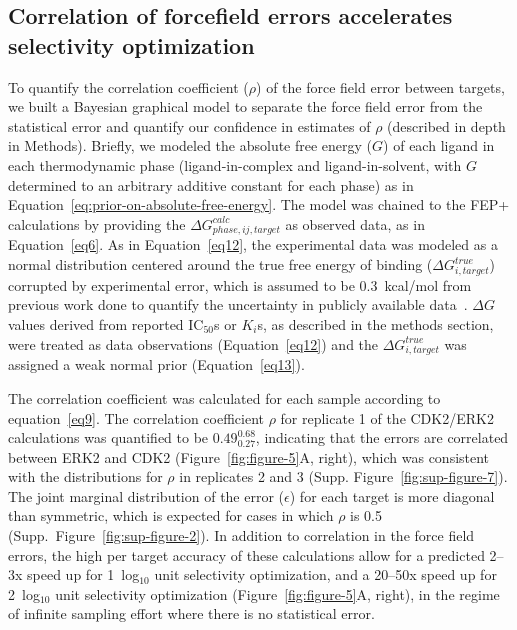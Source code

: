 \documentclass[phd,tocprelim]{cornell}
\begin{document}
\subsection{Correlation of forcefield errors accelerates selectivity optimization}
To quantify the correlation coefficient ($\rho$) of the force field error between targets, we built a Bayesian graphical model to separate the force field error from the statistical error and quantify our confidence in estimates of $\rho$ (described in depth in Methods). 
Briefly, we modeled the absolute free energy ($G$) of each ligand in each thermodynamic phase (ligand-in-complex and ligand-in-solvent, with $G$ determined to an arbitrary additive constant for each phase) as in Equation~\ref{eq:prior-on-absolute-free-energy}. 
The model was chained to the FEP+ calculations by providing the $\Delta G^{calc}_{phase,ij,target}$ as observed data, as in Equation~\ref{eq6}. As in Equation~\ref{eq12}, the experimental data was modeled as a normal distribution centered around the true free energy of binding ($\Delta G^{true}_{i,target}$) corrupted by experimental error, which is assumed to be 0.3~kcal/mol from previous work done to quantify the uncertainty in publicly available data~\citep{BROWN2009420}. 
$\Delta G$ values derived from reported IC$_{50}$s or $K_i$s, as described in the methods section, were treated as data observations (Equation~\ref{eq12}) and the $\Delta G^{true}_{i,target}$ was assigned a weak normal prior (Equation~\ref{eq13}). 

The correlation coefficient was calculated for each sample according to equation~\ref{eq9}. 
The correlation coefficient $\rho$ for replicate 1 of the CDK2/ERK2 calculations was quantified to be $0.49^{0.68}_{0.27}$, indicating that the errors are correlated between ERK2 and CDK2 (Figure~\ref{fig:figure-5}A, right), which was consistent with the distributions for $\rho$ in replicates 2 and 3 (Supp. Figure~\ref{fig:sup-figure-7}). 
The joint marginal distribution of the error ($\epsilon$) for each target is more diagonal than symmetric, which is expected for cases in which $\rho$ is 0.5 (Supp.\ Figure~\ref{fig:sup-figure-2}). 
In addition to correlation in the force field errors, the high per target accuracy of these calculations allow for a predicted 2--3x speed up for 1~log$_{10}$ unit selectivity optimization, and a 20--50x speed up for 2~log$_{10}$ unit selectivity optimization (Figure~\ref{fig:figure-5}A, right), in the regime of infinite sampling effort where there is no statistical error. 
\end{document}
